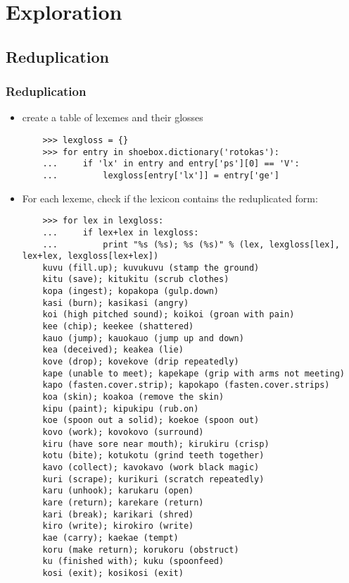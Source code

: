 \documentclass{beamer}
\begin{document}
\section{Exploration}

\subsection{Reduplication}

\begin{frame}[fragile]
\frametitle{Reduplication}
\scriptsize
\begin{itemize}
\item create a table of lexemes and their glosses

\begin{verbatim}
    >>> lexgloss = {}
    >>> for entry in shoebox.dictionary('rotokas'):
    ...     if 'lx' in entry and entry['ps'][0] == 'V':
    ...         lexgloss[entry['lx']] = entry['ge']
\end{verbatim}

\item For each lexeme, check if the lexicon contains the reduplicated form:

\begin{verbatim}
    >>> for lex in lexgloss:
    ...     if lex+lex in lexgloss:
    ...         print "%s (%s); %s (%s)" % (lex, lexgloss[lex], lex+lex, lexgloss[lex+lex])
    kuvu (fill.up); kuvukuvu (stamp the ground)
    kitu (save); kitukitu (scrub clothes)
    kopa (ingest); kopakopa (gulp.down)
    kasi (burn); kasikasi (angry)
    koi (high pitched sound); koikoi (groan with pain)
    kee (chip); keekee (shattered)
    kauo (jump); kauokauo (jump up and down)
    kea (deceived); keakea (lie)
    kove (drop); kovekove (drip repeatedly)
    kape (unable to meet); kapekape (grip with arms not meeting)
    kapo (fasten.cover.strip); kapokapo (fasten.cover.strips)
    koa (skin); koakoa (remove the skin)
    kipu (paint); kipukipu (rub.on)
    koe (spoon out a solid); koekoe (spoon out)
    kovo (work); kovokovo (surround)
    kiru (have sore near mouth); kirukiru (crisp)
    kotu (bite); kotukotu (grind teeth together)
    kavo (collect); kavokavo (work black magic)
    kuri (scrape); kurikuri (scratch repeatedly)
    karu (unhook); karukaru (open)
    kare (return); karekare (return)
    kari (break); karikari (shred)
    kiro (write); kirokiro (write)
    kae (carry); kaekae (tempt)
    koru (make return); korukoru (obstruct)
    ku (finished with); kuku (spoonfeed)
    kosi (exit); kosikosi (exit)
\end{verbatim}
\end{itemize}
\end{frame}
\end{document}
